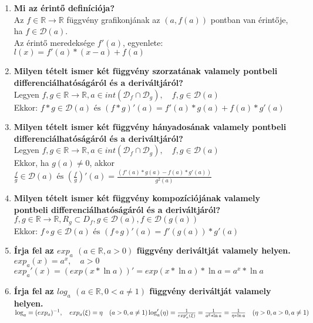 \documentclass[a4paper,12pt]{article}
\begin{document}
\def\N{\mathbb{N}}
\def\Z{\mathbb{Z}}
\def\R{\mathbb{R}}
\def\rtr{\displaystyle\R\to\R}
\def\D{\displaystyle\mathcal{D}}
\def\fda{f\in\D(a)}
\begin{enumerate}
	\item \textbf{Mi az érintő definíciója?}\\[0.2cm]Az $f\in\rtr$ függvény grafikonjának az $(a,f(a))$ pontban van érintője, ha $\fda$.\\[0.2cm]Az érintő meredeksége $f'(a)$, egyenlete: $l(x)=f'(a)*(x-a)+f(a)$
	\item \textbf{Milyen tételt ismer két függvény szorzatának valamely pontbeli differenciálhatóságáról és a deriváltjáról?}\\[0.2cm]Legyen $f,g\in\rtr,a\in int(\D_f\cap\D_g),\quad f,g\in\D(a)$\\[0.2cm]Ekkor: $f*g\in\D(a)\text{ és }(f*g)'(a)= f'(a)*g(a)+f(a)*g'(a)$
	\item \textbf{Milyen tételt ismer két függvény hányadosának valamely pontbeli differenciálhatóságáról és a deriváltjáról?}\\[0.2cm]Legyen $f,g\in\rtr,a\in int(\D_f\cap\D_g),\quad f,g\in\D(a)$\\[0.2cm]Ekkor, ha $g(a)\neq0$, akkor $\frac{f}{g}\in\D(a)\text{ és } (\frac{f}{g})'(a) =\frac{(f'(a)*g(a)-f(a)*g'(a))}{g^2(a)}$
	\item \textbf{Milyen tételt ismer két függvény kompozíciójának valamely pontbeli differenciálhatóságáról és a deriváltjáról?}\\[0.1cm] $f,g\in\rtr,R_g\subset D_f,g \in\D(a),f\in\D(g(a))$\\[0.3cm]Ekkor: $f\circ g\in\D(a)\text{ és }(f\circ g)'(a)= f'(g(a))*g'(a)$
	\item \textbf{Írja fel az $exp_a$ $(a\in\R,a>0)$ függvény deriváltját valamely helyen.}\\[0.2cm]$exp_a(x)=a^x,\quad a>0$\\[0.2cm]$exp_a' (x)=(exp(x*\ln a))'= exp(x*\ln a)*\ln a=a^x*\ln a$
	\item \textbf{Írja fel az $log_a$ $(a\in\R,0<a\neq1)$ függvény deriváltját valamely helyen.}\\[0.2cm]$\log_a=(exp_a)^{-1},\quad exp_a(\xi)=\eta\quad(a>0,a\neq1) \\[0.3cm]\log_a'(\eta)= \frac{1}{exp_a'(\xi)}=\frac{1}{a^\xi*\ln a}= \frac{1}{\eta*\ln a}\quad(\eta>0,a>0,a\neq1)$
\end{enumerate}
\end{document}
